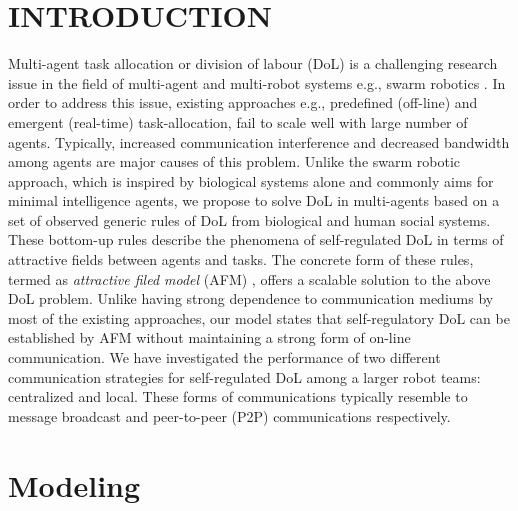 \documentclass[letterpaper, 10 pt, conference]{ieeeconf}  %
\begin{document}
\section{INTRODUCTION}
\label{sec:intro}
Multi-agent task allocation or division of labour (DoL) is a challenging research issue in the field of multi-agent and multi-robot systems e.g., swarm robotics \cite{RefSwarm}. In order to address this issue, existing approaches e.g., predefined (off-line) and emergent (real-time) task-allocation, fail to scale well with large number of agents. Typically, increased communication interference and decreased bandwidth among agents are major causes of this problem. Unlike the swarm robotic approach, which is inspired by biological systems alone and commonly aims for minimal intelligence agents, we propose to solve DoL in multi-agents based on a set of observed generic rules of DoL from biological and human social systems. These bottom-up rules describe the phenomena of self-regulated DoL in terms of attractive fields between agents and tasks. The concrete form of these rules, termed as \textit{attractive filed model} (AFM) \cite{RefElsa}, offers a scalable solution to the above DoL problem. Unlike having strong dependence to communication mediums by most of the existing approaches, our model states that self-regulatory DoL can be established by AFM without maintaining a strong form of on-line communication. 
We have investigated the performance of two different communication strategies for self-regulated DoL among a larger robot teams: centralized and local. These forms of communications typically resemble to message broadcast and peer-to-peer (P2P) communications respectively.


\section{Modeling}
\label{sec:model}
\end{document}
